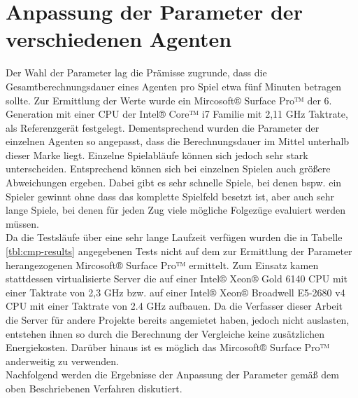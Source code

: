 \section{Anpassung der Parameter der verschiedenen Agenten}
Der Wahl der Parameter lag die Prämisse zugrunde, dass die Gesamtberechnungsdauer eines Agenten pro Spiel etwa fünf Minuten betragen sollte. Zur Ermittlung der Werte wurde ein  Mircosoft® Surface Pro™ der 6. Generation mit einer CPU der Intel® Core™ i7 Familie mit 2,11 GHz Taktrate, als Referenzgerät festgelegt. Dementsprechend wurden die Parameter der einzelnen Agenten so angepasst, dass die Berechnungsdauer im Mittel unterhalb dieser Marke liegt. Einzelne Spielabläufe können sich jedoch sehr stark unterscheiden. Entsprechend können sich bei einzelnen Spielen auch größere Abweichungen ergeben. Dabei gibt es sehr schnelle Spiele, bei denen bspw. ein Spieler gewinnt ohne dass das komplette Spielfeld besetzt ist, aber auch sehr lange Spiele, bei denen für jeden Zug viele mögliche Folgezüge evaluiert werden müssen.
\\Da die Testsläufe über eine sehr lange Laufzeit verfügen wurden die in Tabelle \ref{tbl:cmp-results} angegebenen Tests nicht auf dem zur Ermittlung der Parameter herangezogenen Mircosoft® Surface Pro™ ermittelt. Zum Einsatz kamen stattdessen virtualisierte Server die auf einer Intel® Xeon® Gold 6140 CPU mit einer Taktrate von 2,3 GHz bzw. auf einer Intel® Xeon® Broadwell E5-2680 v4 CPU mit einer Taktrate von 2.4 GHz aufbauen. Da die Verfasser dieser Arbeit die Server für andere Projekte bereits angemietet haben, jedoch nicht auslasten, entstehen ihnen so durch die Berechnung der Vergleiche keine zusätzlichen Energiekosten. Darüber hinaus ist es möglich das Mircosoft® Surface Pro™ anderweitig zu verwenden.
\\Nachfolgend werden die Ergebnisse der Anpassung der Parameter gemäß dem oben Beschriebenen Verfahren diskutiert.
